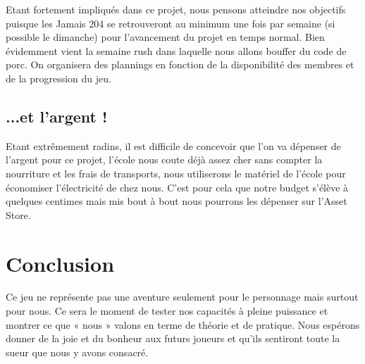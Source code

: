 \documentclass[12pt]{article}
\begin{document}
Etant fortement impliqués dans ce projet, nous pensons atteindre nos objectifs puisque les Jamais 204 se retrouveront au minimum une fois par semaine (si possible le dimanche) pour l’avancement du projet en temps normal. Bien évidemment vient la semaine rush dans laquelle nous allons bouffer du code de porc. On organisera des plannings en fonction de la disponibilité des membres et de la progression du jeu.

\subsection{...et l'argent !}

Etant extrêmement radins, il est difficile de concevoir que l’on va dépenser de l’argent pour ce projet, l’école nous coute déjà assez cher sans compter la nourriture et les frais de transports, nous utiliserons le matériel de l’école pour économiser l’électricité de chez nous. C’est pour cela que notre budget s’élève à quelques centimes mais mis bout à bout nous pourrons les dépenser sur l’Asset Store.

\newpage
\section*{Conclusion}

Ce jeu ne représente pas une aventure seulement pour le personnage mais surtout pour nous. Ce sera le moment de tester nos capacités à pleine puissance et montrer ce que « nous » valons en terme de théorie et de pratique.
Nous espérons donner de la joie et du bonheur aux futurs joueurs et qu’ils sentiront toute la sueur que nous y avons consacré.
\end{document}
